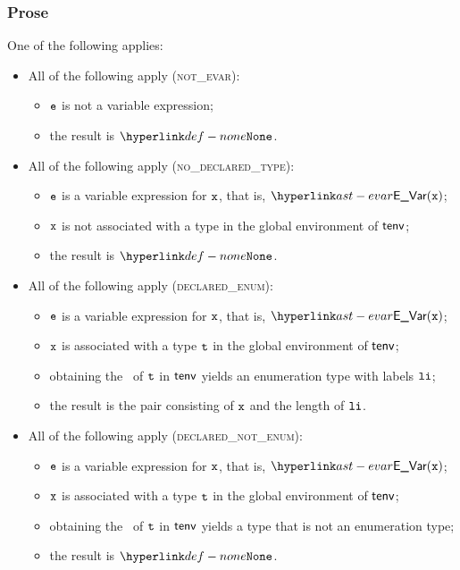 \subsubsection{Prose}
One of the following applies:
\begin{itemize}
  \item All of the following apply (\textsc{not\_evar}):
  \begin{itemize}
    \item $\texttt{e}$ is not a variable expression;
    \item the result is $\None$.
  \end{itemize}

  \item All of the following apply (\textsc{no\_declared\_type}):
  \begin{itemize}
    \item $\texttt{e}$ is a variable expression for $\texttt{x}$, that is, $\EVar(\vx)$;
    \item $\texttt{x}$ is not associated with a type in the global environment of $\textsf{tenv}$;
    \item the result is $\None$.
  \end{itemize}

  \item All of the following apply (\textsc{declared\_enum}):
  \begin{itemize}
    \item $\texttt{e}$ is a variable expression for $\texttt{x}$, that is, $\EVar(\vx)$;
    \item $\texttt{x}$ is associated with a type $\texttt{t}$ in the global environment of $\textsf{tenv}$;
    \item obtaining the \underlyingtype\ of $\texttt{t}$ in $\textsf{tenv}$ yields an enumeration type with labels $\texttt{li}$\ProseOrTypeError;
    \item the result is the pair consisting of $\texttt{x}$ and the length of $\texttt{li}$.
  \end{itemize}

  \item All of the following apply (\textsc{declared\_not\_enum}):
  \begin{itemize}
    \item $\texttt{e}$ is a variable expression for $\texttt{x}$, that is, $\EVar(\vx)$;
    \item $\texttt{x}$ is associated with a type $\texttt{t}$ in the global environment of $\textsf{tenv}$;
    \item obtaining the \underlyingtype\ of $\texttt{t}$ in $\textsf{tenv}$ yields a type that is not an enumeration type;
    \item the result is $\None$.
  \end{itemize}
\end{itemize}

